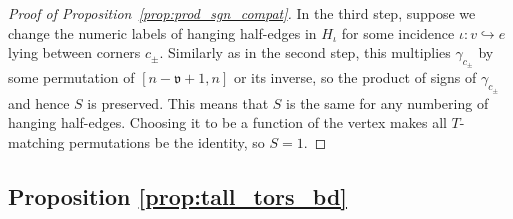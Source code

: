 \documentclass{amsart}
\begin{document}
\begin{proof}[Proof of Proposition~\ref{prop:prod_sgn_compat}]
In the third step, suppose we change the numeric labels of hanging half-edges in $H_\iota$ for some incidence $\iota\colon v\hookrightarrow e$ lying between corners $c_\pm$. Similarly as in the second step, this multiplies $\gamma_{c_\pm}$ by some permutation of $[n-\mathfrak{v}+1,n]$ or its inverse, so the product of signs of $\gamma_{c_\pm}$ and hence $S$ is preserved. This means that $S$ is the same for any numbering of hanging half-edges. Choosing it to be a function of the vertex makes all $T$-matching permutations be the identity, so $S=1$.
\end{proof}

\subsection{Proposition \ref{prop:tall_tors_bd}}\label{ssec:pf_tall_tors_bd}
\end{document}
